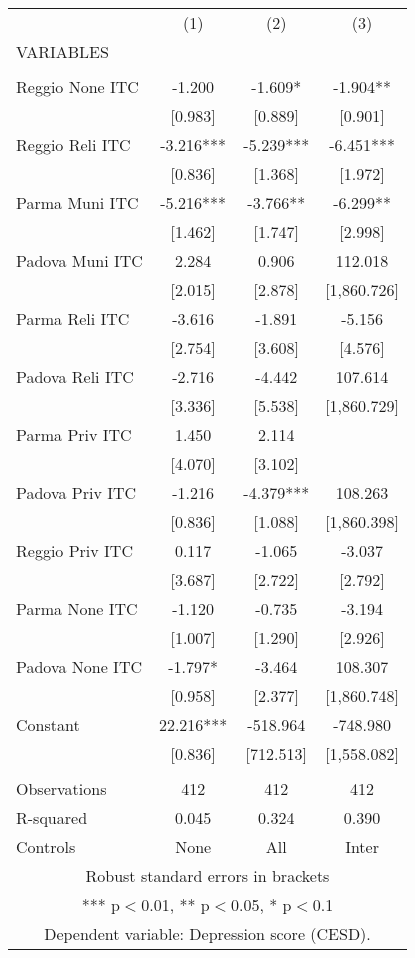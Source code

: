 \begin{tabular}{lccc} \hline
 & (1) & (2) & (3) \\
VARIABLES &  &  &  \\ \hline
 &  &  &  \\
Reggio None ITC & -1.200 & -1.609* & -1.904** \\
 & [0.983] & [0.889] & [0.901] \\
Reggio Reli ITC & -3.216*** & -5.239*** & -6.451*** \\
 & [0.836] & [1.368] & [1.972] \\
Parma Muni ITC & -5.216*** & -3.766** & -6.299** \\
 & [1.462] & [1.747] & [2.998] \\
Padova Muni ITC & 2.284 & 0.906 & 112.018 \\
 & [2.015] & [2.878] & [1,860.726] \\
Parma Reli ITC & -3.616 & -1.891 & -5.156 \\
 & [2.754] & [3.608] & [4.576] \\
Padova Reli ITC & -2.716 & -4.442 & 107.614 \\
 & [3.336] & [5.538] & [1,860.729] \\
Parma Priv ITC & 1.450 & 2.114 &  \\
 & [4.070] & [3.102] &  \\
Padova Priv ITC & -1.216 & -4.379*** & 108.263 \\
 & [0.836] & [1.088] & [1,860.398] \\
Reggio Priv ITC & 0.117 & -1.065 & -3.037 \\
 & [3.687] & [2.722] & [2.792] \\
Parma None ITC & -1.120 & -0.735 & -3.194 \\
 & [1.007] & [1.290] & [2.926] \\
Padova None ITC & -1.797* & -3.464 & 108.307 \\
 & [0.958] & [2.377] & [1,860.748] \\
Constant & 22.216*** & -518.964 & -748.980 \\
 & [0.836] & [712.513] & [1,558.082] \\
 &  &  &  \\
Observations & 412 & 412 & 412 \\
R-squared & 0.045 & 0.324 & 0.390 \\
 Controls & None & All & Inter \\ \hline
\multicolumn{4}{c}{ Robust standard errors in brackets} \\
\multicolumn{4}{c}{ *** p$<$0.01, ** p$<$0.05, * p$<$0.1} \\
\multicolumn{4}{c}{ Dependent variable: Depression score (CESD).} \\
\end{tabular}
